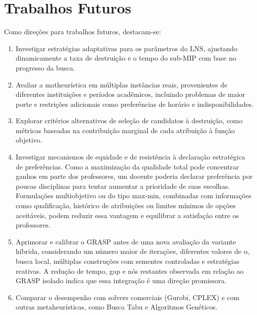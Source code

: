 \section{Trabalhos Futuros}

Como direções para trabalhos futuros, destacam-se:

\begin{enumerate}
  \item Investigar estratégias adaptativas para os parâmetros do LNS, ajustando dinamicamente a taxa de destruição e o tempo do sub-MIP com base no progresso da busca.

  \item Avaliar a matheurística em múltiplas instâncias reais, provenientes de diferentes instituições e períodos acadêmicos, incluindo problemas de maior porte e restrições adicionais como preferências de horário e indisponibilidades.

  \item Explorar critérios alternativos de seleção de candidatos à destruição, como métricas baseadas na contribuição marginal de cada atribuição à função objetivo.

  \item Investigar mecanismos de equidade e de resistência à declaração estratégica de preferências. Como a maximização da qualidade total pode concentrar ganhos em parte dos professores, um docente poderia declarar preferência por poucas disciplinas para tentar aumentar a prioridade de suas escolhas. Formulações multiobjetivo ou do tipo max-min, combinadas com informações como qualificação, histórico de atribuições ou limites mínimos de opções aceitáveis, podem reduzir essa vantagem e equilibrar a satisfação entre os professores.

  \item Aprimorar e calibrar o GRASP antes de uma nova avaliação da variante híbrida, considerando um número maior de iterações, diferentes valores de $\alpha$, busca local, múltiplas construções com sementes controladas e estratégias reativas. A redução de tempo, gap e nós restantes observada em relação ao GRASP isolado indica que essa integração é uma direção promissora.

  \item Comparar o desempenho com solvers comerciais (Gurobi, CPLEX) e com outras metaheurísticas, como Busca Tabu e Algoritmos Genéticos.

\end{enumerate}
